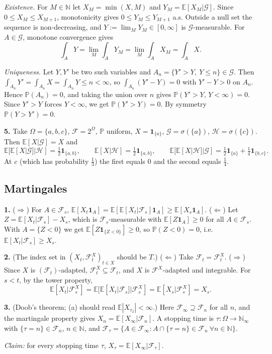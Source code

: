 \documentclass[11pt,a4paper]{article}
\newcommand{\E}{\mathbb{E}}
\renewcommand{\P}{\mathbb{P}}
\newcommand{\N}{\mathbb{N}}
\newcommand{\F}{\mathcal{F}}
\newcommand{\G}{\mathcal{G}}
\newcommand{\Hc}{\mathcal{H}}
\newcommand{\1}{\mathbf{1}}
\newcommand{\prob}[1]{\par\medskip\noindent\textbf{#1}\quad}
\begin{document}
\emph{Existence.} For $M\in\N$ let $X_M=\min(X,M)$ and $Y_M=\E[X_M|\G]$. Since $0\le X_M\le X_{M+1}$, monotonicity gives
$0\le Y_M\le Y_{M+1}$ a.s. Outside a null set the sequence is non-decreasing, and $Y:=\lim_MY_M\in[0,\infty]$ is
$\G$-measurable. For $A\in\G$, monotone convergence gives
\[\int_AY=\lim_M\int_AY_M=\lim_M\int_AX_M=\int_AX.\]

\emph{Uniqueness.} Let $Y,Y'$ be two such variables and $A_n=\{Y'>Y,\ Y\le n\}\in\G$. Then
$\int_{A_n}Y'=\int_{A_n}X=\int_{A_n}Y\le n<\infty$, so $\int_{A_n}(Y'-Y)=0$ with $Y'-Y>0$ on $A_n$. Hence
$\P(A_n)=0$, and taking the union over $n$ gives $\P(Y'>Y,\,Y<\infty)=0$. Since $Y'>Y$ forces $Y<\infty$, we get $\P(Y'>Y)=0$.
By symmetry $\P(Y>Y')=0$.

\prob{5.}
Take $\Omega=\{a,b,c\}$, $\F=2^\Omega$, $\P$ uniform, $X=\1_{\{a\}}$, $\G=\sigma(\{a\})$, $\Hc=\sigma(\{c\})$. Then
$\E[X|\G]=X$ and
\[
\E[\E[X|\G]|\Hc]=\tfrac12\1_{\{a,b\}},\qquad
\E[X|\Hc]=\tfrac12\1_{\{a,b\}},\qquad \E[\E[X|\Hc]|\G]=\tfrac12\1_{\{a\}}+\tfrac14\1_{\{b,c\}}.
\]
At $c$ (which has probability $\frac13$) the first equals $0$ and the second equals $\frac14$.

\subsection*{Martingales}

\prob{1.}
($\Rightarrow$) For $A\in\F_s$, $\E[X_t\1_A]=\E[\E[X_t|\F_s]\1_A]\ge\E[X_s\1_A]$.
($\Leftarrow$) Let $Z=\E[X_t|\F_s]-X_s$, which is $\F_s$-measurable with $\E[Z\1_A]\ge0$ for all $A\in\F_s$.
With $A=\{Z<0\}$ we get $\E[Z\1_{\{Z<0\}}]\ge0$, so $\P(Z<0)=0$, i.e.\ $\E[X_t|\F_s]\ge X_s$.

\prob{2.}
(The index set in $(X_t,\F^X_t)_{t\in X}$ should be $T$.) ($\Leftarrow$) Take $\F_t=\F^X_t$.
($\Rightarrow$) Since $X$ is $(\F_t)$-adapted, $\F^X_t\subseteq\F_t$, and $X$ is $\F^X$-adapted and integrable.
For $s<t$, by the tower property,
\[\E[X_t|\F^X_s]=\E[\E[X_t|\F_s]|\F^X_s]=\E[X_s|\F^X_s]=X_s.\]

\prob{3.}
(Doob's theorem; (a) should read $\E|X_{\tau_2}|<\infty$.) Here $\F_\infty\supseteq\F_n$ for all $n$, and the martingale
property gives $X_n=\E[X_\infty|\F_n]$. A stopping time is $\tau:\Omega\to\N_\infty$ with $\{\tau=n\}\in\F_n$, $n\in\N$, and
$\F_\tau=\{A\in\F_\infty:A\cap\{\tau=n\}\in\F_n\ \forall n\in\N\}$.

\emph{Claim:} for every stopping time $\tau$, $X_\tau=\E[X_\infty|\F_\tau]$.
\end{document}
